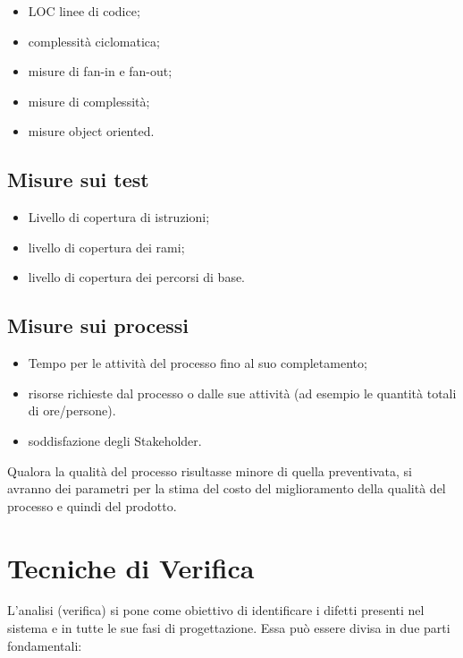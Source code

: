 \begin{itemize}
  
\item LOC linee di codice;
\item complessit\`a ciclomatica;
\item misure di fan-in e fan-out;
\item misure di complessit\`a;
\item misure object oriented.

\end{itemize}


\subsection{Misure sui test}

\begin{itemize}
  
\item Livello di copertura di istruzioni;
\item livello di copertura dei rami;
\item livello di copertura dei percorsi di base.
\end{itemize}


  
\subsection{Misure sui processi} 

\begin{itemize} 
\item Tempo per le attivit\`a del processo fino al suo completamento;
\item risorse richieste dal processo o dalle sue attivit\`a (ad esempio le
quantit\`a totali di ore/persone).
\item soddisfazione degli Stakeholder.  
\end{itemize}

Qualora la qualit\`a del processo risultasse minore di quella preventivata,
si avranno dei parametri per la stima del costo del miglioramento della qualit\`a
del processo e quindi del prodotto.



\section{Tecniche di Verifica}

L'analisi (verifica) si pone come obiettivo di identificare i difetti presenti nel sistema e in tutte le sue fasi di progettazione.
Essa pu\`o essere divisa in due parti fondamentali:

